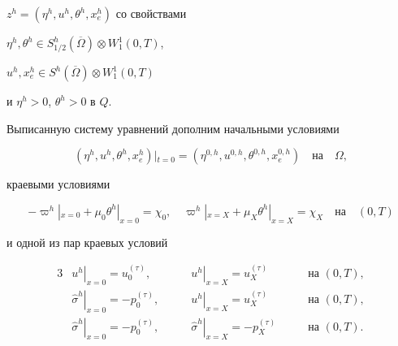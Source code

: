 \documentclass[12pt]{article}
\theoremstyle{plain} %
\theoremstyle{definition}
\numberwithin{equation}{section}
\begin{document}
$z^h = (\eta^h, u^h, \theta^h, x_e^h)$ со свойствами


$\eta^h,\theta^h\in S^h_{1/2}(\overline\Omega)\otimes W^1_1(0,T)$,


$u^h,x_e^h\in S^h(\overline\Omega)\otimes W^1_1(0,T)$


и $\eta^h>0$, $\theta^h>0$ в $Q$.





Выписанную систему уравнений дополним начальными условиями


\begin{equation}


(\eta^h, u^h, \theta^h,x_{e}^h)\left|_{t=0}\right.=


(\eta^{0,h}, u^{0,h}, \theta^{0,h}, x^{0,h}_{e})\quad \text{на}\quad\Omega,


\end{equation}


краевыми условиями


\begin{equation}


-\varpi^h|_{x=0} + \mu_0\theta^h|_{x=0} = \chi_0,\quad


\varpi^h|_{x=X} + \mu_X\theta^h|_{x=X} = \chi_X


\quad\text {на}\quad (0,T)


\end{equation}


и одной из пар краевых условий


\begin{alignat}{3}


 &\left. u^h\right|_{x=0}=u_{0}^{(\tau)},\qquad &


 \left. u^h\right|_{x=X}=u_{X}^{(\tau)}\qquad &\text {на } (0,T),


\tag{$3.7_1$}\\


%


 &\left. \widehat\sigma^h\right|_{x=0}=-p^{(\tau)}_{0},\qquad &


 \left. u^h\right|_{x=X}=u_X^{(\tau)}\qquad &\text {на } (0,T),


\tag{$3.7_2$}\\


%


 &\left. \widehat\sigma^h\right|_{x=0}=-p^{(\tau)}_{0},\qquad &


 \left. \widehat\sigma^h


\right|_{x=X}=-p^{(\tau)}_{X}\qquad &\text {на } (0,T).


\tag{$3.7_3$}


\end{alignat}
\end{document}
